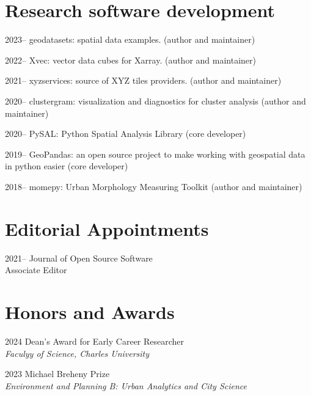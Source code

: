 \documentclass[12pt,a4paper]{report}
\begin{document}
    \section*{Research software development}

    \begin{tablist}

        \item[2023--] \tab{}geodatasets: spatial data examples. (author and maintainer)
        \item[2022--] \tab{}Xvec: vector data cubes for Xarray. (author and maintainer)
        \item[2021--] \tab{}xyzservices: source of XYZ tiles providers. (author and maintainer)
        \item[2020--] \tab{}clustergram: visualization and diagnostics for cluster analysis (author and maintainer)
        \item[2020--] \tab{}PySAL: Python Spatial Analysis Library (core developer)
        \item[2019--] \tab{}GeoPandas: an open source project to make working with geospatial data in python easier (core developer)
        \item[2018--] \tab{}momepy: Urban Morphology Measuring Toolkit (author and maintainer)

    \end{tablist}

    \section*{Editorial Appointments}

    \begin{tablist}

        \item[2021--] \tab{}Journal of Open Source Software \\
                            Associate Editor

    \end{tablist}

    \section*{Honors and Awards}

    \begin{tablist}

        \item[2024] \tab{}Dean's Award for Early Career Researcher \\
            \textit{Faculyy of Science, Charles University}
        \item[2023] \tab{}Michael Breheny Prize \\
                    \textit{Environment and Planning B: Urban Analytics and City Science}

    \end{tablist}
\end{document}
